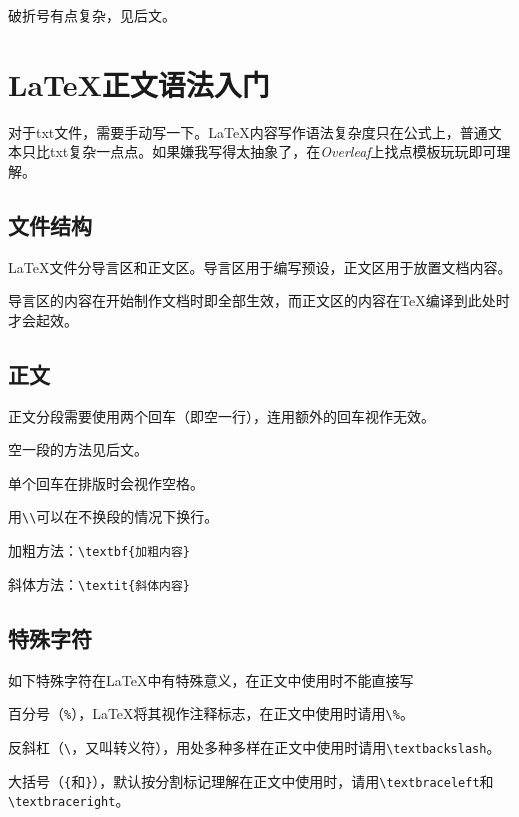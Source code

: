 \documentclass[10pt,openany]{book}
\begin{document}
破折号有点复杂，见后文\emph{}。

\section{\LaTeX 正文语法入门}

对于txt文件，需要手动写一下。\LaTeX 内容写作语法复杂度只在公式上，普通文本只比txt复杂一点点。如果嫌我写得太抽象了，在\textit{Overleaf}上找点模板玩玩即可理解。

\subsection{文件结构}

\LaTeX 文件分导言区和正文区。导言区用于编写预设，正文区用于放置文档内容。



导言区的内容在开始制作文档时即全部生效，而正文区的内容在\TeX 编译到此处时才会起效。

\subsection{正文}

正文分段需要使用两个回车（即空一行），连用额外的回车视作无效。

空一段的方法见后文\emph{}。

单个回车在排版时会视作空格。

用\texttt{\textbackslash{}\textbackslash{}}可以在不换段的情况下换行。

加粗方法：\texttt{\textbackslash{}textbf\{加粗内容\}}

斜体方法：\texttt{\textbackslash{}textit\{斜体内容\}}

\subsection{特殊字符}

如下特殊字符在\LaTeX 中有特殊意义，在正文中使用时不能直接写

百分号（\texttt{\%}），\LaTeX 将其视作注释标志，在正文中使用时请用\texttt{\textbackslash{}\%}。

反斜杠（\texttt{\textbackslash{}}，又叫转义符），用处多种多样在正文中使用时请用\texttt{\textbackslash{}textbackslash}。

大括号（\texttt{\{}和\texttt{\}}），默认按分割标记理解在正文中使用时，请用\texttt{\textbackslash{}textbraceleft}和\texttt{\textbackslash{}textbraceright}。
\end{document}
